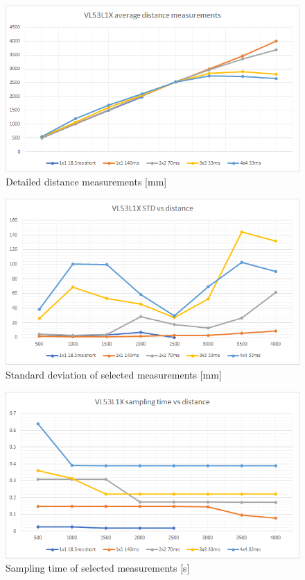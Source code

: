\begin{figure}[!h]
    \centering
	\includegraphics[width=115mm, keepaspectratio]{figures/vl53l1x_measurements_02_dist.png}
    \caption{Detailed distance measurements [mm]}
    \label{fig:vl53l1x_meas_detailed_dist}
\end{figure}

\begin{figure}[!h]
    \centering
	\includegraphics[width=115mm, keepaspectratio]{figures/vl53l1x_measurements_02_std.png}
    \caption{Standard deviation of selected measurements [mm]}
    \label{fig:vl53l1x_meas_detailed_std}
\end{figure}

\newpage

\begin{figure}[!h]
    \centering
	\includegraphics[width=115mm, keepaspectratio]{figures/vl53l1x_measurements_02_ts.png}
    \caption{Sampling time of selected measurements [s]}
    \label{fig:vl53l1x_meas_detailed_ts}
\end{figure}



